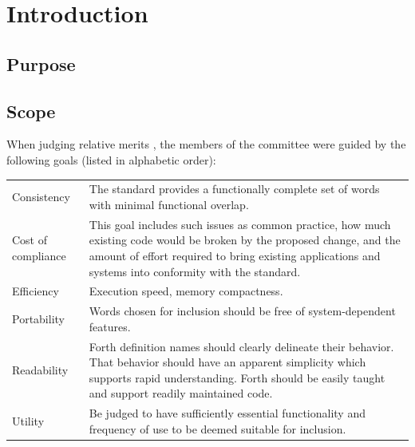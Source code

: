 
\label{annex:rationale}

\ifinline\else
\fi

\newcommand{\readrationale}[1]{%
	\ifinline
		\begin{editor}
			In the \emph{review} (r) version of the document the
			rationale text for each of the words is given in with
			the main definition of the word.  The rationale for
			words in the \textbf{#1} wordset will appear here in
			the final document.
		\end{editor}
	\else
		\defersection{}
		
		\stepsection
	\fi
}

\section{Introduction} %

\subsection{Purpose} %

\subsection{Scope} %
\label{rat:scope}

When judging relative merits
, the members of the
committee were guided by the following goals (listed in alphabetic order):

\begin{tabular}{lp{}}
Consistency	&
	The standard provides a functionally complete set of words with
	minimal functional overlap.
	\\[\parskip]
Cost of compliance &
	This goal includes such issues as common practice, how much
	existing code would be broken by the proposed change, and the
	amount of effort required to bring existing applications and
	systems into conformity with the standard.
	\\[\parskip]
Efficiency &
	Execution speed, memory compactness.
	\\[\parskip]
Portability	&
	Words chosen for inclusion should be free of system-dependent
	features.
	\\[\parskip]
Readability &
	Forth definition names should clearly delineate their behavior.
	That behavior should have an apparent simplicity which supports
	rapid understanding. Forth should be easily taught and support
	readily maintained code.
	\\[\parskip]
Utility	&
	Be judged to have sufficiently essential functionality and
	frequency of use to be deemed suitable for inclusion.
\end{tabular}


